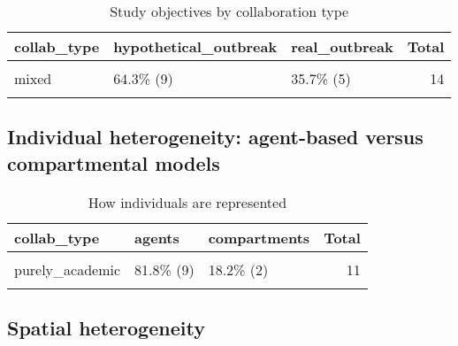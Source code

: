 \documentclass[
]{article}
\begin{document}
\begin{table}[H]

\caption{\label{tab:unnamed-chunk-51}Study objectives by collaboration type}
\centering
\begin{tabular}[t]{lllr}
\toprule
collab\_type & hypothetical\_outbreak & real\_outbreak & Total\\
\midrule
\cellcolor{gray!6}{purely\_academic} & \cellcolor{gray!6}{72.7\%  (8)} & \cellcolor{gray!6}{27.3\% (3)} & \cellcolor{gray!6}{11}\\
mixed & 64.3\%  (9) & 35.7\% (5) & 14\\
\cellcolor{gray!6}{Total} & \cellcolor{gray!6}{68.0\% (17)} & \cellcolor{gray!6}{32.0\% (8)} & \cellcolor{gray!6}{25}\\
\bottomrule
\end{tabular}
\end{table}

\hypertarget{individual-heterogeneity-agent-based-versus-compartmental-models-1}{%
\subsection{Individual heterogeneity: agent-based versus compartmental
models}\label{individual-heterogeneity-agent-based-versus-compartmental-models-1}}

\begin{table}[H]

\caption{\label{tab:unnamed-chunk-52}How individuals are represented}
\centering
\begin{tabular}[t]{lllr}
\toprule
collab\_type & agents & compartments & Total\\
\midrule
\cellcolor{gray!6}{mixed} & \cellcolor{gray!6}{71.4\% (10)} & \cellcolor{gray!6}{28.6\% (4)} & \cellcolor{gray!6}{14}\\
purely\_academic & 81.8\%  (9) & 18.2\% (2) & 11\\
\cellcolor{gray!6}{Total} & \cellcolor{gray!6}{76.0\% (19)} & \cellcolor{gray!6}{24.0\% (6)} & \cellcolor{gray!6}{25}\\
\bottomrule
\end{tabular}
\end{table}

\hypertarget{spatial-heterogeneity-1}{%
\subsection{Spatial heterogeneity}\label{spatial-heterogeneity-1}}
\end{document}
